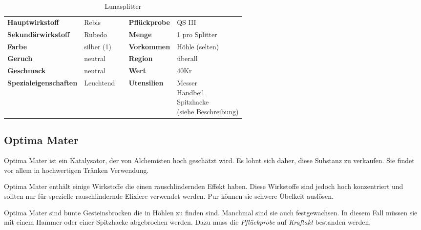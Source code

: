 \begin{table}[h] 
\begin{center} 
\begin{tabular}{|l|l|p{1cm}|l|l|} 
  	\cline{1-2} \cline{4-5} 
  	\textbf{Hauptwirkstoff} & Rebis && \textbf{Pflückprobe} & QS III \\ \cline{1-2} \cline{4-5} 
  	\textbf{Sekundärwirkstoff} & Rubedo && \textbf{Menge} & 1 pro Splitter \\ \cline{1-2} \cline{4-5} 
  	\textbf{Farbe} & silber (1) && \textbf{Vorkommen} & Höhle (selten) \\ \cline{1-2} \cline{4-5} 
  	\textbf{Geruch} & neutral && \textbf{Region} & überall \\ \cline{1-2} \cline{4-5} 
  	\textbf{Geschmack} & neutral && \textbf{Wert} & 40Kr \\ \cline{1-2} \cline{4-5} 
  	\textbf{Spezialeigenschaften} & Leuchtend && \textbf{Utensilien} & \brcell{Messer \\ Handbeil \\ Spitzhacke \\ (siehe Beschreibung)} \\ \cline{1-2} \cline{4-5} 
\end{tabular} 
\end{center} 
\caption{Lunasplitter} 
\label{tab:lunasplitter} 
\end{table}


\subsection{Optima Mater}
Optima Mater ist ein Katalysator, der von Alchemisten hoch geschätzt wird. Es lohnt sich daher, diese Substanz zu verkaufen. Sie findet vor allem in hochwertigen Tränken Verwendung. 

Optima Mater enthält einige Wirkstoffe die einen rauschlindernden Effekt haben. Diese Wirkstoffe sind jedoch hoch konzentriert und sollten nur für spezielle rauschlindernde Elixiere verwendet werden. Pur können sie schwere Übelkeit auslösen.

Optima Mater sind bunte Gesteinsbrocken die in Höhlen zu finden sind. Manchmal sind sie auch festgewachsen. In diesem Fall müssen sie mit einem Hammer oder einer Spitzhacke abgebrochen werden. Dazu muss die \textit{Pflückprobe} auf \textit{Kraftakt} bestanden werden.

